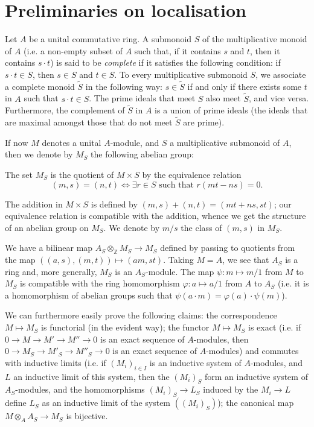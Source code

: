 \documentclass{article}
\newcommand{\oldpage}[1]{\marginpar{\footnotesize$\Big\vert$ \textit{p.~#1}}}
\begin{document}
\section{Preliminaries on localisation}
\label{section1}

Let $A$ be a unital commutative ring.
A submonoid $S$ of the multiplicative monoid of $A$ (i.e. a non-empty subset of $A$ such that, if it contains $s$ and $t$, then it contains $s\cdot t$) is said to be \emph{complete} if it satisfies the following condition:
if $s\cdot t\in S$, then $s\in S$ and $t\in S$.
To every multiplicative submonoid
\oldpage{1-02}
$S$, we associate a complete monoid $\widetilde{S}$ in the following way:
$s\in\widetilde{S}$ if and only if there exists some $t$ in $A$ such that $s\cdot t\in S$.
The prime ideals that meet $S$ also meet $\widetilde{S}$, and vice versa.
Furthermore, the complement of $\widetilde{S}$ in $A$ is a union of prime ideals (the ideals that are maximal amongst those that do not meet $\widetilde{S}$ are prime).

If now $M$ denotes a unital $A$-module, and $S$ a multiplicative submonoid of $A$, then we denote by $M_S$ the following abelian group:

The set $M_S$ is the quotient of $M\times S$ by the equivalence relation
\[
  (m,s) = (n,t) \iff \exists r\in S\mbox{ such that }r(mt-ns)=0.
\]

The addition in $M\times S$ is defined by $(m,s)+(n,t)=(mt+ns,st)$;
our equivalence relation is compatible with the addition, whence we get the structure of an abelian group on $M_S$.
We denote by $m/s$ the class of $(m,s)$ in $M_S$.

We have a bilinear map $A_S\otimes_\mathbb{Z}M_S\to M_S$ defined by passing to quotients from the map $((a,s),(m,t))\mapsto(am,st)$.
Taking $M=A$, we see that $A_S$ is a ring and, more generally, $M_S$ is an $A_S$-module.
The map $\psi\colon m\mapsto m/1$ from $M$ to $M_S$ is compatible with the ring homomorphism $\varphi\colon a\mapsto a/1$ from $A$ to $A_S$ (i.e. it is a homomorphism of abelian groups such that $\psi(a\cdot m)=\varphi(a)\cdot\psi(m)$).

We can furthermore easily prove the following claims:
the correspondence $M\mapsto M_S$ is functorial (in the evident way);
the functor $M\mapsto M_S$ is exact (i.e. if $0\to M\to M'\to M''\to 0$ is an exact sequence of $A$-modules, then $0\to M_S\to M'_S\to M''_S\to 0$ is an exact sequence of $A$-modules) and commutes with inductive limits (i.e. if $(M_i)_{i\in I}$ is an inductive system of $A$-modules, and $L$ an inductive limit of this system, then the $(M_i)_S$ form an inductive system of $A_S$-modules, and the homomorphisms $(M_i)_S\to L_S$ induced by the $M_i\to L$ define $L_S$ as an inductive limit of the system $((M_i)_S)$); the canonical map $M\otimes_A A_S\to M_S$ is bijective.
\end{document}
